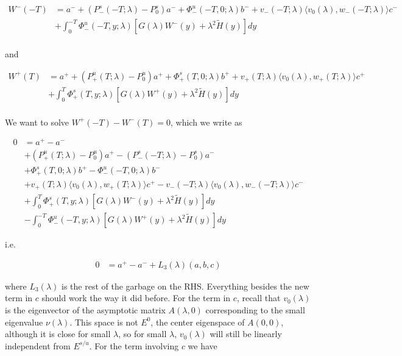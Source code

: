 \documentclass[12pt]{article}
\begin{document}
\begin{enumerate}
\begin{align*}
W^-(-T) &= a^- + (P^s_-(-T; \lambda) - P_0^s)a^- + \Phi^u_-(-T, 0; \lambda)b^- + v_-(-T; \lambda) \langle v_0(\lambda), w_-(-T; \lambda) \rangle c^-\\
&+ \int_0^{-T} \Phi^u_-(-T, y; \lambda)[ G(\lambda)W^-(y) + \lambda^2 \tilde{H}(y) ] dy \\
\end{align*}

and

\begin{align*}
W^+(T) &= a^+ + (P^u_+(T; \lambda) - P_0^u)a^+ + \Phi^s_+(T, 0; \lambda)b^+ + v_+(T; \lambda) \langle v_0(\lambda), w_+(T; \lambda) \rangle c^+ \\
&+ \int_0^T \Phi^s_+(T, y; \lambda) [ G(\lambda)W^+(y) + \lambda^2 \tilde{H}(y) ] dy \\
\end{align*}

We want to solve $W^+(-T) - W^-(T) = 0$, which we write as

\begin{align*}
0 &= a^+ - a^- \\
&+ (P^u_+(T; \lambda) - P_0^u)a^+ - (P^s_-(-T; \lambda) - P_0^s)a^- \\
&+ \Phi^s_+(T, 0; \lambda)b^+ - \Phi^u_-(-T, 0; \lambda)b^- \\
&+ v_+(T; \lambda) \langle v_0(\lambda), w_+(T; \lambda) \rangle c^+ - v_-(-T; \lambda) \langle v_0(\lambda), w_-(-T; \lambda) \rangle c^- \\
&+ \int_0^{T} \Phi^s_+(T, y; \lambda) [ G(\lambda)W^-(y) + \lambda^2 \tilde{H}(y) ] dy \\
&- \int_0^{-T} \Phi^u_-(-T, y; \lambda) [ G(\lambda)W^+(y) + \lambda^2 \tilde{H}(y) ] dy
\end{align*}

i.e. 

\begin{align*}
0 &= a^+ - a^- + L_3(\lambda)(a, b, c)
\end{align*}

where $L_3(\lambda)$ is the rest of the garbage on the RHS. Everything besides the new term in $c$ should work the way it did before. For the term in $c$, recall that $v_0(\lambda)$ is the eigenvector of the asymptotic matrix $A(\lambda, 0)$ corresponding to the small eigenvalue $\nu(\lambda)$. This space is not $E^0$, the center eigenspace of $A(0, 0)$, although it is close for small $\lambda$, so for small $\lambda$, $v_0(\lambda)$ will still be linearly independent from $E^{s/u}$. For the term involving $c$ we have 


\end{enumerate}
\end{document}
